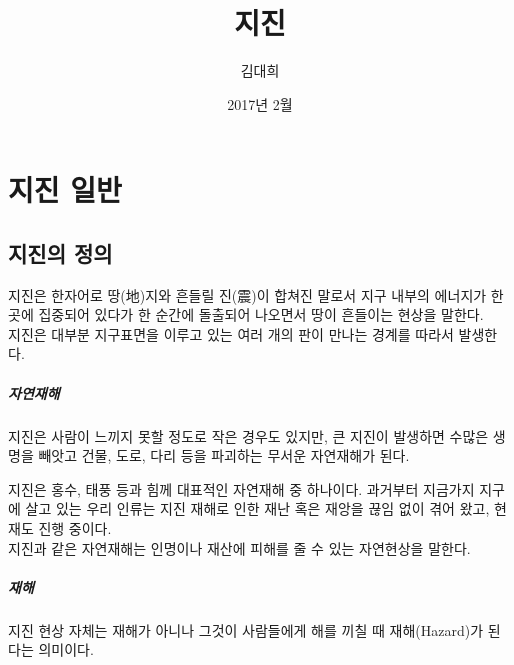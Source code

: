 \documentclass[12pt, a4paper, oneside]{book}
\begin{document}
	
			\dominitoc
			

			\title{지진}
			\author{김대희}
			\date{2017년 2월}
			\maketitle


			\tableofcontents

			


	\clearpage
	\chapter{지진 일반}




	\clearpage
	\section{지진의 정의}

	지진은 한자어로 땅(地)지와 흔들릴 진(震)이 합쳐진 말로서 지구 내부의 에너지가 한 곳에 집중되어 있다가 한 순간에 돌출되어 나오면서 땅이 흔들이는 현상을 말한다. \\
		
	지진은 대부분 지구표면을 이루고 있는 여러 개의 판이 만나는 경계를 따라서 발생한다. \\
	
	\paragraph{자연재해}
	지진은 사람이 느끼지 못할 정도로 작은 경우도 있지만, 큰 지진이 발생하면 수많은 생명을 빼앗고 건물, 도로, 다리 등을 파괴하는 무서운 자연재해가 된다.
	
	지진은 홍수, 태풍 등과 힘께 대표적인 자연재해 중 하나이다. 
	과거부터 지금가지 지구에 살고 있는 우리 인류는 지진 재해로 인한 재난 혹은 재앙을 끊임 없이 겪어 왔고, 현재도 진행 중이다. \\
	
	지진과 같은 자연재해는 인명이나 재산에 피해를 줄 수 있는 자연현상을 말한다. \\
	
	\paragraph{재해}
	지진 현상 자체는 재해가 아니나 그것이 사람들에게 해를 끼칠 때 재해(Hazard)가 된다는 의미이다.
	
\end{document}
